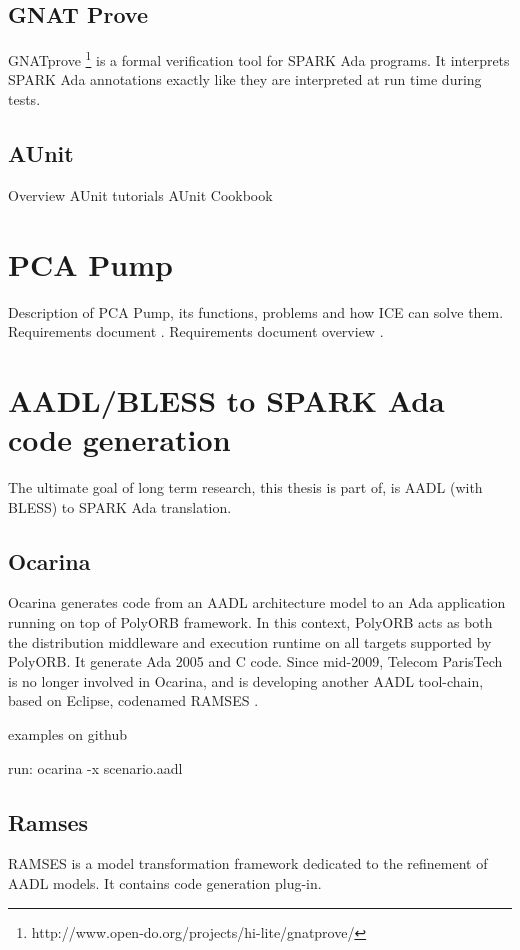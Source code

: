 \subsection{GNAT Prove}
\label{background:spark:gnatprove}
GNATprove \footnote{http://www.open-do.org/projects/hi-lite/gnatprove/} is a formal verification tool for SPARK Ada programs. It interprets SPARK Ada annotations exactly like they are interpreted at run time during tests.


\subsection{AUnit}
\label{background:spark:aunit}
Overview
AUnit tutorials \cite{AUnitTutorials:Online}
AUnit Cookbook \cite{AUnitCookbook:Online}



\section{PCA Pump}
\label{background:pcapump}
Description of PCA Pump, its functions, problems and how ICE can solve them.
Requirements document \cite{PcaReq}.
Requirements document overview \cite{OpenSourcePCAPump:Paper}.


\section{AADL/BLESS to SPARK Ada code generation}
\label{background:codegen}
The ultimate goal of long term research, this thesis is part of, is AADL (with BLESS) to SPARK Ada translation.


\subsection{Ocarina}
\label{background:codegen:ocarina}
Ocarina \cite{Ocarina:Paper,Ocarina:Paper} generates code from an AADL architecture model to an Ada application running on top of PolyORB framework. In this context, PolyORB acts as both the distribution middleware and execution runtime on all targets supported by PolyORB.
It generate Ada 2005 and C code.
Since mid-2009, Telecom ParisTech is no longer involved in Ocarina, and is developing another AADL tool-chain, based on Eclipse, codenamed RAMSES \cite{Ocarina:About:Online}.

examples on github

run:
ocarina -x scenario.aadl




\subsection{Ramses}
\label{background:codegen:ramses}
RAMSES is a model transformation framework dedicated to the refinement of AADL models. It contains code generation plug-in.
